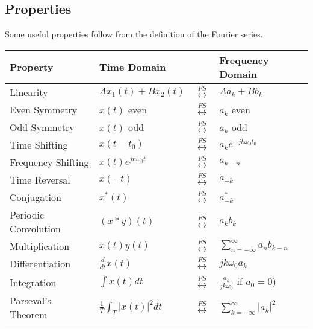 \subsection{Properties}

Some useful properties follow from the definition
of the Fourier series.

\begin{table}[ht]
    \centering
    \label{tab:ctfourier_properties}
    \begin{tabular}{llll}
        \toprule
        \textbf{Property}    & \textbf{Time Domain}             &                                 & \textbf{Frequency Domain}                 \\
        \midrule
        Linearity            & $A x_1(t) + B x_2(t)$            & $\overset{FS}{\leftrightarrow}$ & $A a_k + B b_k$                           \\
        Even Symmetry        & $x(t)$ even                      & $\overset{FS}{\leftrightarrow}$ & $a_k$ even                                \\
        Odd Symmetry         & $x(t)$ odd                       & $\overset{FS}{\leftrightarrow}$ & $a_k$ odd                                 \\
        Time Shifting        & $x(t - t_0)$                     & $\overset{FS}{\leftrightarrow}$ & $a_k e^{-j k \omega_0 t_0}$               \\
        Frequency Shifting   & $x(t) e^{j n \omega_0 t}$        & $\overset{FS}{\leftrightarrow}$ & $a_{k - n}$                               \\
        Time Reversal        & $x(-t)$                          & $\overset{FS}{\leftrightarrow}$ & $a_{-k}$                                  \\
        Conjugation          & $x^*(t)$                         & $\overset{FS}{\leftrightarrow}$ & $a_{-k}^*$                                \\
        Periodic Convolution & $(x \ast y)(t)$                  & $\overset{FS}{\leftrightarrow}$ & $a_k b_k$                                 \\
        Multiplication       & $x(t) y(t)$                      & $\overset{FS}{\leftrightarrow}$ & $\sum_{n=-\infty}^{\infty} a_n b_{k - n}$ \\
        Differentiation      & $\frac{d}{dt} x(t)$              & $\overset{FS}{\leftrightarrow}$ & $j k \omega_0 a_k$                        \\
        Integration          & $\int x(t) dt$                   & $\overset{FS}{\leftrightarrow}$ & $\frac{a_k}{j k \omega_0}$ if $a_0 = 0$)  \\
        Parseval's Theorem   & $\frac{1}{T} \int_T |x(t)|^2 dt$ & $\overset{FS}{\leftrightarrow}$ & $\sum_{k=-\infty}^{\infty} |a_k|^2$       \\
        \bottomrule
    \end{tabular}
\end{table}

